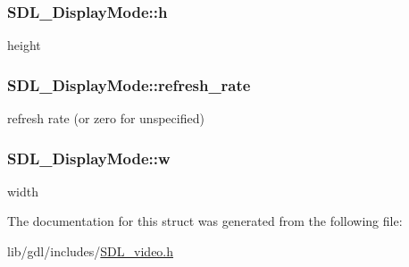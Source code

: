 \subsubsection[{h}]{ S\+D\+L\+\_\+\+Display\+Mode\+::h}\label{struct_s_d_l___display_mode_a0d9eabed50a560ed553af772c26632d7}
height \hypertarget{struct_s_d_l___display_mode_ad1b5783c9b292ebf24ad4e0e7a98e540}{}
\subsubsection[{refresh\+\_\+rate}]{ S\+D\+L\+\_\+\+Display\+Mode\+::refresh\+\_\+rate}\label{struct_s_d_l___display_mode_ad1b5783c9b292ebf24ad4e0e7a98e540}
refresh rate (or zero for unspecified) \hypertarget{struct_s_d_l___display_mode_a504bb5e21950b719a0df43be51199046}{}
\subsubsection[{w}]{ S\+D\+L\+\_\+\+Display\+Mode\+::w}\label{struct_s_d_l___display_mode_a504bb5e21950b719a0df43be51199046}
width 

The documentation for this struct was generated from the following file\+:\begin{DoxyCompactItemize}
\item 
lib/gdl/includes/\hyperlink{_s_d_l__video_8h}{S\+D\+L\+\_\+video.\+h}\end{DoxyCompactItemize}
